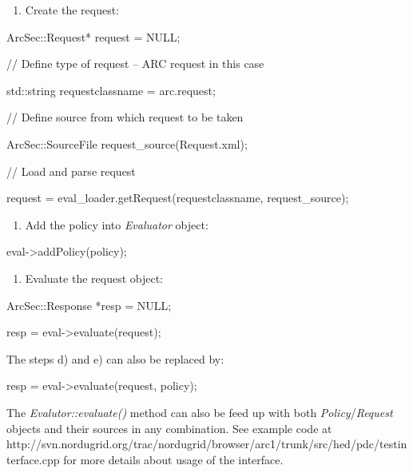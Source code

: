 \documentclass[a4paper]{article}
\newcommand\liststyleWWviiiNumv{%
\renewcommand\theenumi{\alph{enumi}}
\renewcommand\theenumii{\arabic{enumii}}
\renewcommand\theenumiii{\arabic{enumiii}}
\renewcommand\theenumiv{\arabic{enumiv}}
\renewcommand\labelenumi{\theenumi)}
\renewcommand\labelenumii{\theenumii.}
\renewcommand\labelenumiii{\theenumiii.}
\renewcommand\labelenumiv{\theenumiv.}
}
\newcommand\liststyleWWviiiNumvi{%
\renewcommand\theenumi{\alph{enumi}}
\renewcommand\theenumii{\arabic{enumii}}
\renewcommand\theenumiii{\arabic{enumiii}}
\renewcommand\theenumiv{\arabic{enumiv}}
\renewcommand\labelenumi{\theenumi)}
\renewcommand\labelenumii{\theenumii.}
\renewcommand\labelenumiii{\theenumiii.}
\renewcommand\labelenumiv{\theenumiv.}
}
\newcommand\liststyleWWviiiNumvii{%
\renewcommand\theenumi{\alph{enumi}}
\renewcommand\theenumii{\arabic{enumii}}
\renewcommand\theenumiii{\arabic{enumiii}}
\renewcommand\theenumiv{\arabic{enumiv}}
\renewcommand\labelenumi{\theenumi)}
\renewcommand\labelenumii{\theenumii.}
\renewcommand\labelenumiii{\theenumiii.}
\renewcommand\labelenumiv{\theenumiv.}
}
\begin{document}
\liststyleWWviiiNumv
\begin{enumerate}
\item {\color{black}
Create the request:}
\end{enumerate}
{\ttfamily\color{black}
ArcSec::Request* request = NULL;}

{\ttfamily\color{black}
// Define type of request -- ARC request in this case}

{\ttfamily\color{black}
std::string requestclassname =
{\textquotedbl}arc.request{\textquotedbl};}

{\ttfamily\color{black}
// Define source from which request to be taken}

{\ttfamily\color{black}
ArcSec::SourceFile
request\_source({\textquotedbl}Request.xml{\textquotedbl});}

{\ttfamily\color{black}
// Load and parse request}

{\ttfamily\color{black}
request = eval\_loader.getRequest(requestclassname, request\_source);}

\liststyleWWviiiNumvi
\begin{enumerate}
\item {\color{black}
Add the policy into \textit{Evaluator} object:}
\end{enumerate}
{\ttfamily\color{black}
eval-{\textgreater}addPolicy(policy);}

\liststyleWWviiiNumvii
\begin{enumerate}
\item {\color{black}
Evaluate the request object:}
\end{enumerate}
{\ttfamily\color{black}
ArcSec::Response *resp = NULL;}

{\ttfamily\color{black}
resp = eval-{\textgreater}evaluate(request);}

{\color{black}
The steps d) and e) can also be replaced by:}

{\ttfamily\color{black}
resp = eval-{\textgreater}evaluate(request, policy);}


\bigskip

{\upshape\color{black}
The \textit{Evalutor::evaluate()} method can also be feed up with both
\textit{Policy}/\textit{Request} objects and their sources in any
combination. See example code at
http://svn.nordugrid.org/trac/nordugrid/browser/arc1/trunk/src/hed/pdc/testinterface.cpp
for more details about usage of the interface.}
\end{document}
